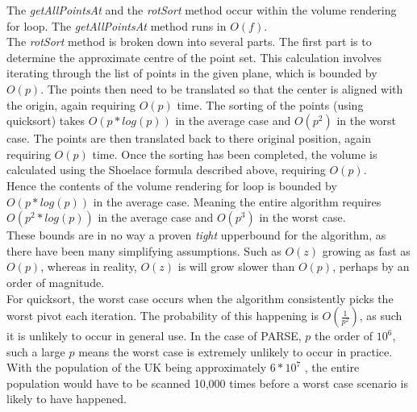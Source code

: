The \textit{getAllPointsAt} and the \textit{rotSort} method occur within the volume rendering for loop. 
The  \textit{getAllPointsAt} method runs in  $O(f)$.\\

The \textit{rotSort} method is broken down into several parts. 
The first part is to determine the approximate centre of the point set. 
This calculation involves iterating through the list of points in the given plane, which is bounded by $O(p)$. 
The points then need to be translated so that the center is aligned with the origin, again requiring $O(p)$ time. 
The sorting of the points (using quicksort) takes $O(p * log(p))$ in the average case and $O(p^2)$ in the worst case. 
The points are then translated back to there original position, again requiring $O(p)$ time. 
Once the sorting has been completed, the volume is calculated using the Shoelace formula described above, requiring $O(p)$.\\

Hence the contents of the volume rendering for loop is bounded by $O(p * log(p))$ in the average case. 
Meaning the entire algorithm requires $O(p^2 * log(p))$ in the average case and $O(p^3)$ in the worst case. \\

These bounds are in no way a proven \textit{tight} upperbound for the algorithm, as there have been many simplifying assumptions. 
Such as $O(z)$ growing as fast as $O(p)$, whereas in reality, $O(z)$ is will grow slower than $O(p)$, perhaps by an order of magnitude.\\

For quicksort, the worst case occurs when the algorithm consistently picks the worst pivot each iteration. 
The probability of this happening is $O(\frac{1}{p^2})$, as such it is unlikely to occur in general use. 
In the case of PARSE, $p$ the order of $10^6$, such a large $p$ means the worst case is extremely unlikely to occur in practice. With the population of the UK being approximately $6 * 10^7$ \cite{UnitedKingdomofGreatBritain2011}, the entire population would have to be scanned 10,000 times before a worst case scenario is likely to have happened.